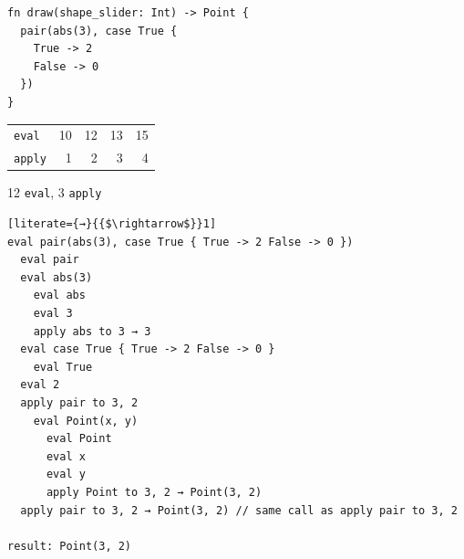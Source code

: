 \begin{parts}
\begin{blocksection}
\begin{lstlisting}
fn draw(shape_slider: Int) -> Point {
  pair(abs(3), case True {
    True -> 2
    False -> 0
  })
}
\end{lstlisting}

\begin{tabular}{lrrrr}
\lstinline$eval$ & 10 & 12 & 13 & 15 \\
\lstinline$apply$ & 1 & 2 & 3 & 4
\end{tabular}

\begin{solution}
12 \lstinline$eval$, 3 \lstinline$apply$
\begin{lstlisting}[literate={→}{{$\rightarrow$}}1]
eval pair(abs(3), case True { True -> 2 False -> 0 })
  eval pair
  eval abs(3)
    eval abs
    eval 3
    apply abs to 3 → 3
  eval case True { True -> 2 False -> 0 }
    eval True
  eval 2
  apply pair to 3, 2
    eval Point(x, y)
      eval Point
      eval x
      eval y
      apply Point to 3, 2 → Point(3, 2)
  apply pair to 3, 2 → Point(3, 2) // same call as apply pair to 3, 2

result: Point(3, 2)
\end{lstlisting}
\end{solution}
\end{blocksection}
\end{parts}

